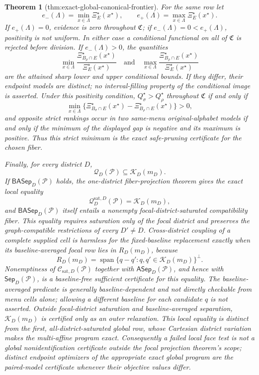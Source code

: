 \documentclass{article}
\newtheorem{theorem}{Theorem}
\begin{document}
\begin{theorem}[thm:exact-global-canonical-frontier]
For the same row let
\[
e_-(\Lambda)=\min_{x\in\Lambda}\Xi_E^\star(x^\star),
\qquad e_+(\Lambda)=\max_{x\in\Lambda}\Xi_E^\star(x^\star).
\]
If \(e_+(\Lambda)=0\), evidence is zero throughout \(\mathfrak C\); if \(e_-(\Lambda)=0<e_+(\Lambda)\), positivity is not uniform. In either case a conditional functional on all of \(\mathfrak C\) is rejected before division. If \(e_-(\Lambda)>0\), the quantities
\[
\min_{x\in\Lambda}
\frac{\Xi_{B_\rho\cap E}^\star(x^\star)}{\Xi_E^\star(x^\star)}
\quad\text{and}\quad
\max_{x\in\Lambda}
\frac{\Xi_{B_\rho\cap E}^\star(x^\star)}{\Xi_E^\star(x^\star)}
\]
are the attained sharp lower and upper conditional bounds. If they differ, their endpoint models are distinct; no interval-filling property of the conditional image is asserted. Under this positivity condition, \(Q_\sigma^\star>Q_\rho^\star\) throughout \(\mathfrak C\) if and only if
\[
\min_{x\in\Lambda}
\{\Xi_{B_\sigma\cap E}^\star(x^\star)-\Xi_{B_\rho\cap E}^\star(x^\star)\}>0,
\]
and opposite strict rankings occur in two same-menu original-alphabet models if and only if the minimum of the displayed gap is negative and its maximum is positive. Thus this strict minimum is the exact safe-pruning certificate for the chosen fiber.

Finally, for every district \(D\),
\[
\mathcal Q_D(\mathcal P)\subseteq\mathcal K_D(m_D).
\]
If \(\mathsf{BASep}_D(\mathcal P)\) holds, the one-district fiber-projection theorem gives the exact local equality
\[
\mathcal Q_D^{\mathrm{sat},D}(\mathcal P)=\mathcal K_D(m_D),
\]
and \(\mathsf{BASep}_D(\mathcal P)\) itself entails a nonempty focal-district-saturated compatibility fiber. This equality requires saturation only of the focal district and preserves the graph-compatible restrictions of every \(D'\ne D\). Cross-district coupling of a complete supplied cell is harmless for the fixed-baseline replacement exactly when its baseline-averaged focal row lies in \(R_D(m_D)\), because
\[
R_D(m_D)=\operatorname{span}\{q-q':q,q'\in\mathcal K_D(m_D)\}^{\perp}.
\]
Nonemptiness of \(\mathcal C_{\mathrm{sat},D}(\mathcal P)\) together with \(\mathsf{ASep}_D(\mathcal P)\), and hence with \(\mathsf{Sep}_D(\mathcal P)\), is a baseline-free sufficient certificate for this equality. The baseline-averaged predicate is generally baseline-dependent and not directly checkable from menu cells alone; allowing a different baseline for each candidate \(q\) is not asserted. Outside focal-district saturation and baseline-averaged separation, \(\mathcal K_D(m_D)\) is certified only as an outer relaxation. This local equality is distinct from the first, all-district-saturated global row, whose Cartesian district variation makes the multi-affine program exact. Consequently a failed local face test is not a global nonidentification certificate outside the focal projection theorem's scope; distinct endpoint optimizers of the appropriate exact global program are the paired-model certificate whenever their objective values differ.
\end{theorem}
\end{document}
